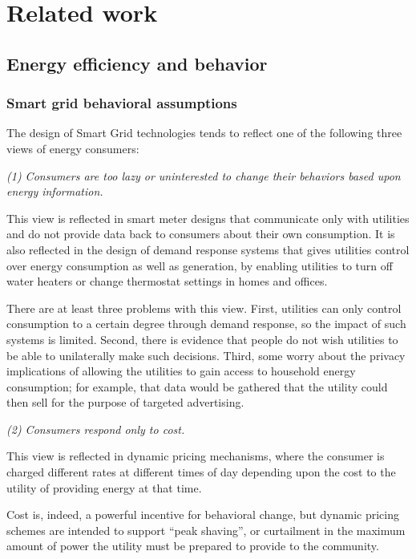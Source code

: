 \section{Related work}
\label{sec:related-work}

\subsection{Energy efficiency and behavior}

\subsubsection{Smart grid behavioral assumptions}

The design of Smart Grid technologies tends to reflect one of the following
three views of energy consumers:

{\em (1) Consumers are too lazy or uninterested to change their 
behaviors based upon energy information.}

This view is reflected in smart meter designs that communicate only with
utilities and do not provide data back to consumers about their own
consumption. It is also reflected in the design of demand response systems
that gives utilities control over energy consumption as well as
generation, by enabling utilities to turn off water heaters or change
thermostat settings in homes and offices. 

There are at least three problems with this view. First, utilities can only
control consumption to a certain degree through demand response, so the
impact of such systems is limited.  Second, there is evidence that people
do not wish utilities to be able to unilaterally make such decisions.
Third, some worry about the privacy implications of allowing the utilities
to gain access to household energy consumption; for example, that data
would be gathered that the utility could then sell for the purpose of
targeted advertising.

{\em (2) Consumers respond only to cost.}

This view is reflected in dynamic pricing mechanisms, where the consumer is
charged different rates at different times of day depending upon the cost
to the utility of providing energy at that time.

Cost is, indeed, a powerful incentive for behavioral change, but dynamic
pricing schemes are intended to support ``peak shaving'', or curtailment in
the maximum amount of power the utility must be prepared to provide to the
community.

